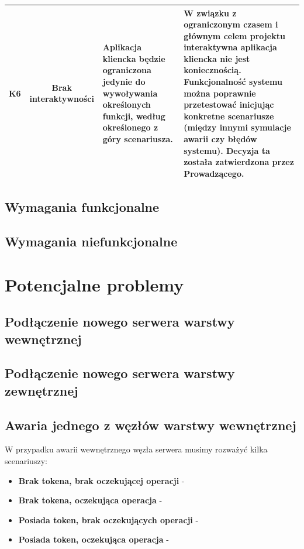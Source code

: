 \begin{center}
\begin{tabular}{|c|c|l|l|}
\hline
\label{z:k6} K6 & 
Brak interaktywności & Aplikacja kliencka będzie ograniczona jedynie do wywoływania określonych funkcji, według określonego z góry scenariusza. & 
W związku z ograniczonym czasem i głównym celem projektu interaktywna aplikacja kliencka nie jest koniecznością. Funkcjonalność systemu można poprawnie przetestować inicjując konkretne scenariusze (między innymi symulacje awarii czy błędów systemu). Decyzja ta została zatwierdzona przez Prowadzącego.\\
\hline
\end{tabular} 

\end{center}

\subsection[Wymagania funkcjonalne]{Wymagania funkcjonalne}

\subsection[Wymagania niefunkcjonalne]{Wymagania niefunkcjonalne}

\section[Potencjalne problemy]{Potencjalne problemy}

\subsection*[Podłączenie nowego serwera warstwy wewnętrznej]{Podłączenie nowego serwera warstwy wewnętrznej}

\subsection*[Podłączenie nowego serwera warstwy zewnętrznej]{Podłączenie nowego serwera warstwy zewnętrznej}

\subsection*[Awaria węzła warstwy wewnętrznej]{Awaria jednego z węzłów warstwy wewnętrznej}

\par{W przypadku awarii wewnętrznego węzła serwera musimy rozważyć kilka scenariuszy:}

\begin{itemize}

\item \textbf{Brak tokena, brak oczekującej operacji} - 

\item \textbf{Brak tokena, oczekująca operacja} - 

\item \textbf{Posiada token, brak oczekujących operacji} - 

\item \textbf{Posiada token, oczekująca operacja} - 

\end{itemize}

